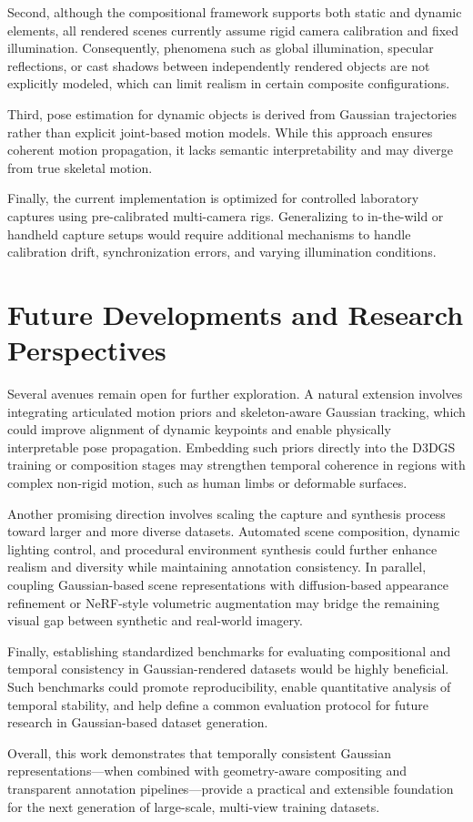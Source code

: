 Second, although the compositional framework supports both static and dynamic elements, all rendered scenes currently assume rigid camera calibration and fixed illumination.
Consequently, phenomena such as global illumination, specular reflections, or cast shadows between independently rendered objects are not explicitly modeled, which can limit realism in certain composite configurations.

Third, pose estimation for dynamic objects is derived from Gaussian trajectories rather than explicit joint-based motion models.
While this approach ensures coherent motion propagation, it lacks semantic interpretability and may diverge from true skeletal motion.

Finally, the current implementation is optimized for controlled laboratory captures using pre-calibrated multi-camera rigs.
Generalizing to in-the-wild or handheld capture setups would require additional mechanisms to handle calibration drift, synchronization errors, and varying illumination conditions.

\section{Future Developments and Research Perspectives}

Several avenues remain open for further exploration.
A natural extension involves integrating articulated motion priors and skeleton-aware Gaussian tracking, which could improve alignment of dynamic keypoints and enable physically interpretable pose propagation.
Embedding such priors directly into the D3DGS training or composition stages may strengthen temporal coherence in regions with complex non-rigid motion, such as human limbs or deformable surfaces.

Another promising direction involves scaling the capture and synthesis process toward larger and more diverse datasets.
Automated scene composition, dynamic lighting control, and procedural environment synthesis could further enhance realism and diversity while maintaining annotation consistency.
In parallel, coupling Gaussian-based scene representations with diffusion-based appearance refinement or NeRF-style volumetric augmentation may bridge the remaining visual gap between synthetic and real-world imagery.

Finally, establishing standardized benchmarks for evaluating compositional and temporal consistency in Gaussian-rendered datasets would be highly beneficial.
Such benchmarks could promote reproducibility, enable quantitative analysis of temporal stability, and help define a common evaluation protocol for future research in Gaussian-based dataset generation.

Overall, this work demonstrates that temporally consistent Gaussian representations—when combined with geometry-aware compositing and transparent annotation pipelines—provide a practical and extensible foundation for the next generation of large-scale, multi-view training datasets.
